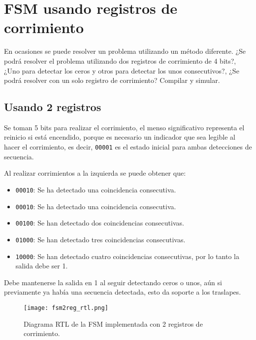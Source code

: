 \section{FSM usando registros de corrimiento \label{sec:s3}}



\begin{center}
	\begin{minipage}{10cm}
		En ocasiones se puede resolver un problema utilizando un método diferente. ¿Se podrá
		resolver el problema utilizando dos registros de corrimiento de 4 bits?, ¿Uno para detectar los
		ceros y otros para detectar los unos consecutivos?, ¿Se podrá resolver con un solo registro de
		corrimiento? Compilar y simular.
	\end{minipage}
\end{center}

\enter

\subsection{Usando 2 registros}
	Se toman 5 bits para realizar el corrimiento, el menso significativo representa el reinicio si está encendido, porque es necesario un indicador que sea legible al hacer el corrimiento, es decir, \texttt{00001} es el estado inicial para ambas
	detecciones de secuencia.
	
	\enter
	
	Al realizar corrimientos a la izquierda se puede obtener que:
	\begin{itemize}
		\item \texttt{00010}: Se ha detectado una coincidencia consecutiva.
		\item \texttt{00010}: Se ha detectado una coincidencia consecutiva.
		\item \texttt{00100}: Se han detectado dos coincidencias consecutivas.
		\item \texttt{01000}: Se han detectado tres coincidencias consecutivas.
		\item \texttt{10000}: Se han detectado cuatro coincidencias consecutivas, por lo tanto la salida debe ser 1.
	\end{itemize}
	Debe mantenerse la salida en 1 al seguir detectando ceros o unos, aún si previamente ya había una secuencia detectada, esto da soporte a los traslapes.
	
	
	\begin{figure}[ht]
		\centering
		\texttt{[image: fsm2reg\_rtl.png]}
		\caption{
			Diagrama RTL de la FSM implementada con 2 registros de corrimiento.
			\label{fig:fsm2reg_rtl}
		}
	\end{figure}
	
